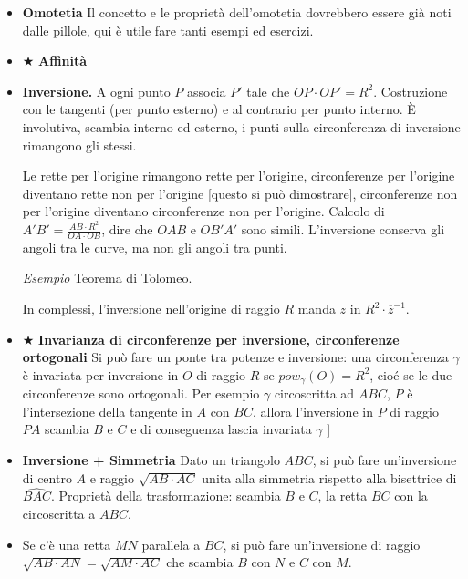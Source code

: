 \begin{itemize}
\item \textbf{Omotetia} Il concetto e le proprietà dell'omotetia dovrebbero essere già noti dalle pillole, qui è utile fare tanti esempi ed esercizi.


\item $\bigstar$ \textbf{Affinità}


\vspace{0.4cm}

\item \textbf{Inversione.} A ogni punto $P$ associa $P'$ tale che $OP\cdot OP'=R^2$. Costruzione con le tangenti (per punto esterno) e al contrario per punto interno. È involutiva, scambia interno ed esterno, i punti sulla circonferenza di inversione rimangono gli stessi. 

Le rette per l'origine rimangono rette per l'origine, circonferenze per l'origine diventano rette non per l'origine [questo si può dimostrare], circonferenze non per l'origine diventano circonferenze non per l'origine. Calcolo di $A'B'=\frac{AB\cdot R^2}{OA \cdot OB}$, dire che $OAB$ e $OB'A'$ sono simili. L'inversione conserva gli angoli tra le curve, ma non gli angoli tra punti.

\textit{Esempio} Teorema di Tolomeo.

In complessi, l'inversione nell'origine di raggio $R$ manda $z$ in $R^2\cdot \overline{z}^{-1}$. 


\item $\bigstar$ \textbf{Invarianza di circonferenze per inversione, circonferenze ortogonali} Si può fare un ponte tra potenze e inversione: una circonferenza $\gamma$ è invariata per inversione in $O$ di raggio $R$ se $pow_{\gamma}(O)=R^2$, cioé se le due circonferenze sono ortogonali. Per esempio $\gamma$ circoscritta ad $ABC$, $P$ è l'intersezione della tangente in $A$ con $BC$, allora l'inversione in $P$ di raggio $PA$ scambia $B$ e $C$ e di conseguenza lascia invariata $\gamma$ ]

\item \textbf{Inversione + Simmetria}
Dato un triangolo $ABC$, si può fare un'inversione di centro $A$ e raggio $\sqrt{AB\cdot AC}$ unita alla simmetria rispetto alla bisettrice di $\widehat{BAC}$. Proprietà della trasformazione: scambia $B$ e $C$, la retta $BC$ con la circoscritta a $ABC$.\\

\item Se c'è una retta $MN$ parallela a $BC$, si può fare un'inversione di raggio $\sqrt{AB\cdot AN}=\sqrt{AM\cdot AC}$ che scambia $B$ con $N$ e $C$ con $M$.

\end{itemize}



